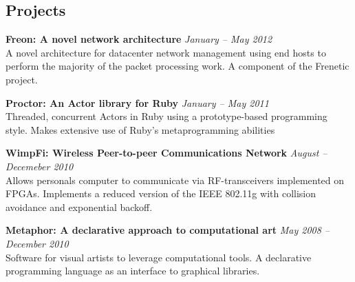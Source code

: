 \documentclass[margin,line]{resume}
\begin{document}
\begin{resume}
    \section{Projects}
    {\bf Freon: A novel network architecture} \hfill
    {\it January -- May 2012}\\
    A novel architecture for datacenter network management using end hosts to
    perform the majority of the packet processing work. A component of the
    Frenetic project.

    {\bf Proctor: An Actor library for Ruby} \hfill
    {\it January -- May 2011}\\
    Threaded, concurrent Actors in Ruby using a prototype-based programming
    style. Makes extensive use of Ruby's metaprogramming abilities

    {\bf WimpFi: Wireless Peer-to-peer Communications Network} \hfill
    {\it August -- Decemeber 2010}\\
    Allows personals computer to communicate via RF-transceivers implemented on
    FPGAs. Implements a reduced version of the IEEE 802.11g with collision
    avoidance and exponential backoff.

    {\bf Metaphor: A declarative approach to computational art} \hfill
    {\it May 2008 -- December 2010}\\
    Software for visual artists to leverage computational tools. A declarative
    programming language as an interface to graphical libraries.


\end{resume}
\end{document}
